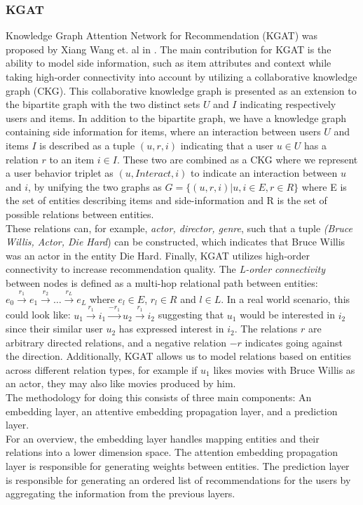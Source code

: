 \subsubsection{KGAT}
Knowledge Graph Attention Network for Recommendation (KGAT) was proposed by Xiang Wang et. al in \cite{KGAT}.
The main contribution for KGAT is the ability to model side information, such as item attributes and context while taking high-order connectivity into account by utilizing a collaborative knowledge graph (CKG).
This collaborative knowledge graph is presented as an extension to the bipartite graph with the two distinct sets $U$ and $I$ indicating respectively users and items.
In addition to the bipartite graph, we have a knowledge graph containing side information for items, where an interaction between users $U$ and items $I$ is described as a tuple $(u, r, i)$ indicating that a user $u \in U$ has a relation $r$ to an item $i \in I$.
These two are combined as a CKG where we represent a user behavior triplet as $(u, Interact, i)$ to indicate an interaction between $u$ and $i$, by unifying the two graphs as $G = \{(u, r, i) | u, i \in E, r \in R\}$ where E is the set of entities describing items and side-information and R is the set of possible relations between entities.\\
These relations can, for example, \textit{actor, director, genre}, such that a tuple \textit{(Bruce Willis, Actor, Die Hard}) can be constructed, which indicates that Bruce Willis was an actor in the entity Die Hard.
Finally, KGAT utilizes high-order connectivity to increase recommendation quality.
The \textit{L-order connectivity} between nodes is defined as a multi-hop relational path between entities: $e_0 \overset{r_1}{\rightarrow} e_1 \overset{r_2}{\rightarrow} \dots \overset{r_L}{\rightarrow} e_L$ where $e_l \in E$, $r_l \in R$ and $l \in L$.
In a real world scenario, this could look like: $u_1 \overset{r_1}{\rightarrow} i_1 \overset{-r_1}{\rightarrow} u_2 \overset{r_1}{\rightarrow} i_2$ suggesting that $u_1$ would be interested in $i_2$ since their similar user $u_2$ has expressed interest in $i_2$.
The relations $r$ are arbitrary directed relations, and a negative relation $-r$ indicates going against the direction.
Additionally, KGAT allows us to model relations based on entities across different relation types, for example if $u_1$ likes movies with Bruce Willis as an actor, they may also like movies produced by him.
\\
The methodology for doing this consists of three main components: An embedding layer, an attentive embedding propagation layer, and a prediction layer.\\
For an overview, the embedding layer handles mapping entities and their relations into a lower dimension space.
The attention embedding propagation layer is responsible for generating weights between entities.
The prediction layer is responsible for generating an ordered list of recommendations for the users by aggregating the information from the previous layers.
